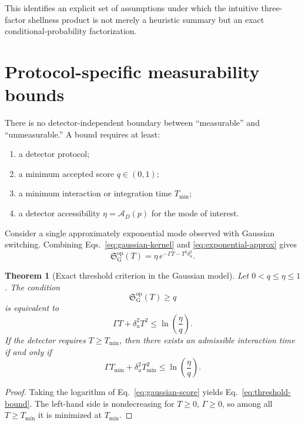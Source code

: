 \documentclass[11pt]{article}
\newtheorem{theorem}{Theorem}
\theoremstyle{remark}
\newcommand{\Sop}{\mathfrak S}
\newcommand{\Access}{\mathcal A}
\begin{document}
This identifies an explicit set of assumptions under which the intuitive three-factor shellness product is not merely a heuristic summary but an exact conditional-probability factorization.


\section{Protocol-specific measurability bounds}

There is no detector-independent boundary between ``measurable'' and ``unmeasurable.'' A bound requires at least:
\begin{enumerate}[label=(\roman*)]
  \item a detector protocol;
  \item a minimum accepted score $q\in(0,1)$;
  \item a minimum interaction or integration time $T_{\min}$;
  \item a detector accessibility $\eta=\Access_D(p)$ for the mode of interest.
\end{enumerate}

Consider a single approximately exponential mode observed with Gaussian switching. Combining Eqs.~\eqref{eq:gaussian-kernel} and \eqref{eq:exponential-approx} gives
\begin{equation}
  \Sop^{\mathrm{op}}_{\mathrm G}(T)
  =\eta\,e^{-\Gamma T-T^2\delta_u^2}.
  \label{eq:gaussian-score}
\end{equation}

\begin{theorem}[Exact threshold criterion in the Gaussian model]
Let $0<q\le\eta\le1$. The condition
\begin{equation}
  \Sop^{\mathrm{op}}_{\mathrm G}(T)\ge q
\end{equation}
is equivalent to
\begin{equation}
  \Gamma T+\delta_u^2T^2
  \le\ln\!\left(\frac{\eta}{q}\right).
  \label{eq:threshold-bound}
\end{equation}
If the detector requires $T\ge T_{\min}$, then there exists an admissible interaction time if and only if
\begin{equation}
  \Gamma T_{\min}+\delta_u^2T_{\min}^2
  \le\ln\!\left(\frac{\eta}{q}\right).
  \label{eq:existence-bound}
\end{equation}
\end{theorem}

\begin{proof}
Taking the logarithm of Eq.~\eqref{eq:gaussian-score} yields Eq.~\eqref{eq:threshold-bound}. The left-hand side is nondecreasing for $T\ge0$, $\Gamma\ge0$, so among all $T\ge T_{\min}$ it is minimized at $T_{\min}$.
\end{proof}
\end{document}
